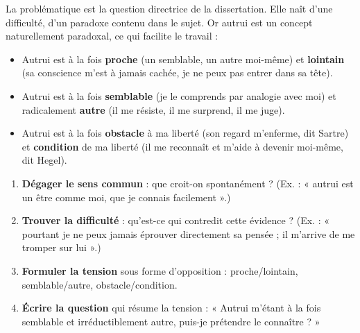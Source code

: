 \documentclass[11pt]{article}
\newcommand{\cle}[1]{{\popxbold\color{popdark}#1}}
\begin{document}
La \cle{problématique} est la question directrice de la dissertation. Elle naît d'une difficulté, d'un paradoxe contenu dans le sujet. Or autrui est un concept naturellement paradoxal, ce qui facilite le travail :
\begin{itemize}
\item Autrui est à la fois \textbf{proche} (un semblable, un autre moi-même) et \textbf{lointain} (sa conscience m'est à jamais cachée, je ne peux pas entrer dans sa tête).
\item Autrui est à la fois \textbf{semblable} (je le comprends par analogie avec moi) et radicalement \textbf{autre} (il me résiste, il me surprend, il me juge).
\item Autrui est à la fois \textbf{obstacle} à ma liberté (son regard m'enferme, dit Sartre) et \textbf{condition} de ma liberté (il me reconnaît et m'aide à devenir moi-même, dit Hegel).
\end{itemize}

\begin{methode}
\begin{enumerate}
\item \textbf{Dégager le sens commun} : que croit-on spontanément ? (Ex. : « autrui est un être comme moi, que je connais facilement ».)
\item \textbf{Trouver la difficulté} : qu'est-ce qui contredit cette évidence ? (Ex. : « pourtant je ne peux jamais éprouver directement sa pensée ; il m'arrive de me tromper sur lui ».)
\item \textbf{Formuler la tension} sous forme d'opposition : proche/lointain, semblable/autre, obstacle/condition.
\item \textbf{Écrire la question} qui résume la tension : « Autrui m'étant à la fois semblable et irréductiblement autre, puis-je prétendre le connaître ? »
\end{enumerate}
\end{methode}
\end{document}
